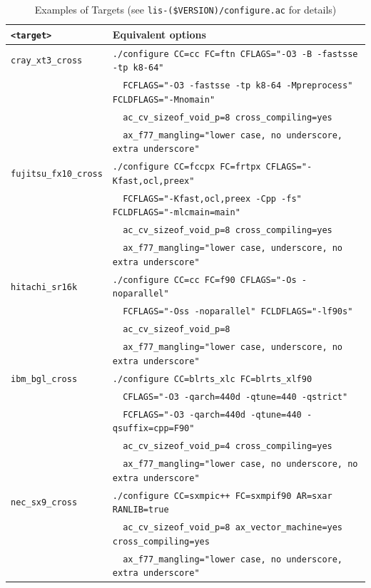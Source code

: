 \documentclass[a4paper]{article}
\begin{document}
\begin{table}[htbp]
\caption{Examples of Targets (see {\tt lis-(\$VERSION)/configure.ac} for details)}
\label{targetoption}
\begin{center}
\begin{tabular}{|l|l|}
\hline
\verb+<target>+           & Equivalent options \\ \hline
\verb+cray_xt3_cross+     & \verb+./configure CC=cc FC=ftn CFLAGS="-O3 -B -fastsse -tp k8-64"+ \\
                          & \verb+  FCFLAGS="-O3 -fastsse -tp k8-64 -Mpreprocess" FCLDFLAGS="-Mnomain"+\\
                          & \verb+  ac_cv_sizeof_void_p=8 cross_compiling=yes+\\
                          & \verb+  ax_f77_mangling="lower case, no underscore, extra underscore"+ \\ \hline
\verb+fujitsu_fx10_cross+ & \verb|./configure CC=fccpx FC=frtpx CFLAGS="-Kfast,ocl,preex"| \\
                          & \verb+  FCFLAGS="-Kfast,ocl,preex -Cpp -fs" FCLDFLAGS="-mlcmain=main"+\\
                          & \verb+  ac_cv_sizeof_void_p=8 cross_compiling=yes+\\
                          & \verb+  ax_f77_mangling="lower case, underscore, no extra underscore"+ \\ \hline
\verb+hitachi_sr16k+      & \verb|./configure CC=cc FC=f90 CFLAGS="-Os -noparallel"| \\
                          & \verb+  FCFLAGS="-Oss -noparallel" FCLDFLAGS="-lf90s"+ \\
                          & \verb+  ac_cv_sizeof_void_p=8+ \\
                          & \verb+  ax_f77_mangling="lower case, underscore, no extra underscore" + \\ \hline
\verb+ibm_bgl_cross+      & \verb+./configure CC=blrts_xlc FC=blrts_xlf90+ \\
                          & \verb+  CFLAGS="-O3 -qarch=440d -qtune=440 -qstrict"+ \\
                          & \verb+  FCFLAGS="-O3 -qarch=440d -qtune=440 -qsuffix=cpp=F90"+ \\
                          & \verb+  ac_cv_sizeof_void_p=4 cross_compiling=yes+\\
                          & \verb+  ax_f77_mangling="lower case, no underscore, no extra underscore"+ \\ \hline
\verb+nec_sx9_cross+      & \verb|./configure CC=sxmpic++ FC=sxmpif90 AR=sxar RANLIB=true | \\
                          & \verb+  ac_cv_sizeof_void_p=8 ax_vector_machine=yes cross_compiling=yes+ \\ 
                          & \verb+  ax_f77_mangling="lower case, no underscore, extra underscore"+ \\ \hline
\end{tabular}
\end{center}
\end{table}
\end{document}
